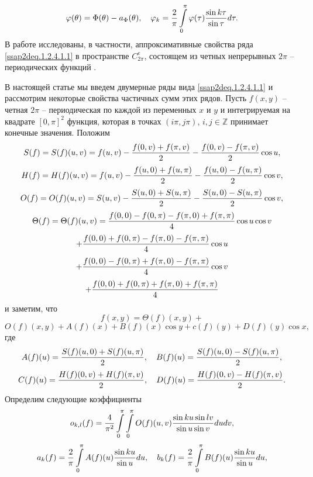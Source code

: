 $$
\varphi(\theta)=\Phi(\theta)-a_\Phi(\theta),\quad \varphi_k={\frac2\pi}
\int\limits_{0}^\pi \varphi(\tau){\sin k\tau\over\sin\tau}d\tau.
$$
В работе \cite{shii2} исследованы, в частности, аппроксимативные свойства ряда \eqref{ssap2deq.1.2.4.1.1} в пространстве $C^e_{2\pi}$, состоящем из четных непрерывных $2\pi$ -- периодических функций .






В настоящей статье мы введем двумерные ряды вида \eqref{ssap2deq.1.2.4.1.1} и рассмотрим некоторые свойства частичных сумм этих рядов.
Пусть $f(x,y)$ -- четная $2\pi$ -- периодическая по каждой из переменных $x$ и $y$ и интегрируемая на квадрате $[0,\pi]^2$ функция, которая в точках $(i\pi,j\pi)$, $i,j\in \mathbb{Z}$ принимает конечные значения. Положим
\begin{equation}\label{ssap2deq.1.2.4.1.2}
S(f)=S(f)(u,v)=f(u,v)-{f(0,v)+f(\pi,v)\over2}-{f(0,v)-f(\pi,v)\over2}\cos u,
\end{equation}
\begin{equation}\label{ssap2deq.1.2.4.1.3}
H(f)=H(f)(u,v)=f(u,v)-{f(u,0)+f(u,\pi)\over2}-{f(u,0)-f(u,\pi)\over2}\cos v,
\end{equation}
\begin{equation}\label{ssap2deq.1.2.4.1.4}
O(f)=O(f)(u,v)=S(u,v)-{S(u,0)+S(u,\pi)\over2}-{S(u,0)-S(u,\pi)\over2}\cos v,
\end{equation}
$$
\Theta(f)=\Theta(f)(u,v)={f(0,0)-f(0,\pi)-f(\pi,0)+f(\pi,\pi)\over4}\cos u\cos v
$$
$$
+{f(0,0)+f(0,\pi)-f(\pi,0)-f(\pi,\pi)\over4}\cos u
$$
$$
+{f(0,0)-f(0,\pi)+f(\pi,0)-f(\pi,\pi)\over4}\cos v
$$
\begin{equation}\label{ssap2deq.1.2.4.1.5}
+{f(0,0)+f(0,\pi)+f(\pi,0)+f(\pi,\pi)\over4}
\end{equation}
и заметим, что
$$
f(x,y)=\Theta(f)(x,y)+
$$
\begin{equation}\label{ssap2deq.1.2.4.1.6}
O(f)(x,y)+A(f)(x)+B(f)(x)\cos y+c(f)(y)+D(f)(y)\cos x,
\end{equation}
где
$$
A(f)(u)={S(f)(u,0)+S(f)(u,\pi)\over2},\quad B(f)(u)={S(f)(u,0)-S(f)(u,\pi)\over2},
$$
$$
C(f)(u)={H(f)(0,v)+H(f)(\pi,v)\over2},\quad D(f)(u)={H(f)(0,v)-H(f)(\pi,v)\over2}.
$$
Определим следующие коэффициенты
\begin{equation}\label{ssap2deq.1.2.4.1.7}
o_{k,l}(f)=\frac4{\pi^2}\int\limits_0^\pi\int\limits_0^\pi
 O(f)(u,v){\sin ku\sin lv\over\sin u\sin v}dudv,
 \end{equation}
\begin{equation}\label{ssap2deq.1.2.4.1.8}
a_k(f)=\frac2{\pi}\int\limits_0^\pi A(f)(u){\sin ku\over\sin u}du,\quad
b_k(f)=\frac2{\pi}\int\limits_0^\pi B(f)(u){\sin ku\over\sin u}du,
\end{equation}
